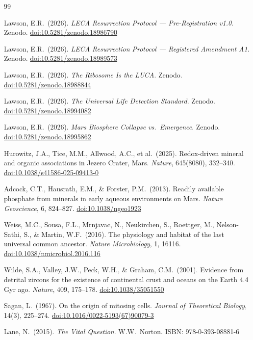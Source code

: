 \documentclass[11pt, a4paper]{article}
\begin{document}
\begin{thebibliography}{99}

Lawson, E.R.\ (2026).
\textit{LECA Resurrection Protocol ---
Pre-Registration v1.0}.
Zenodo.
\href{https://doi.org/10.5281/zenodo.18986790}
{doi:10.5281/zenodo.18986790}

Lawson, E.R.\ (2026).
\textit{LECA Resurrection Protocol ---
Registered Amendment A1}.
Zenodo.
\href{https://doi.org/10.5281/zenodo.18989573}
{doi:10.5281/zenodo.18989573}

Lawson, E.R.\ (2026).
\textit{The Ribosome Is the LUCA}.
Zenodo.
\href{https://doi.org/10.5281/zenodo.18988844}
{doi:10.5281/zenodo.18988844}

Lawson, E.R.\ (2026).
\textit{The Universal Life Detection Standard}.
Zenodo.
\href{https://doi.org/10.5281/zenodo.18994082}
{doi:10.5281/zenodo.18994082}

Lawson, E.R.\ (2026).
\textit{Mars Biosphere Collapse vs.\ Emergence}.
Zenodo.
\href{https://doi.org/10.5281/zenodo.18995862}
{doi:10.5281/zenodo.18995862}

Hurowitz, J.A., Tice, M.M., Allwood, A.C.,
et al.\ (2025).
Redox-driven mineral and organic associations
in Jezero Crater, Mars.
\textit{Nature}, 645(8080), 332--340.
\href{https://doi.org/10.1038/s41586-025-09413-0}
{doi:10.1038/s41586-025-09413-0}

Adcock, C.T., Hausrath, E.M.,
\& Forster, P.M.\ (2013).
Readily available phosphate from minerals
in early aqueous environments on Mars.
\textit{Nature Geoscience}, 6, 824--827.
\href{https://doi.org/10.1038/ngeo1923}
{doi:10.1038/ngeo1923}

Weiss, M.C., Sousa, F.L., Mrnjavac, N.,
Neukirchen, S., Roettger, M.,
Nelson-Sathi, S., \& Martin, W.F.\ (2016).
The physiology and habitat of the last
universal common ancestor.
\textit{Nature Microbiology}, 1, 16116.
\href{https://doi.org/10.1038/nmicrobiol.2016.116}
{doi:10.1038/nmicrobiol.2016.116}

Wilde, S.A., Valley, J.W., Peck, W.H.,
\& Graham, C.M.\ (2001).
Evidence from detrital zircons for the
existence of continental crust and oceans
on the Earth 4.4\,Gyr ago.
\textit{Nature}, 409, 175--178.
\href{https://doi.org/10.1038/35051550}
{doi:10.1038/35051550}

Sagan, L.\ (1967).
On the origin of mitosing cells.
\textit{Journal of Theoretical Biology},
14(3), 225--274.
\href{https://doi.org/10.1016/0022-5193(67)90079-3}
{doi:10.1016/0022-5193(67)90079-3}

Lane, N.\ (2015).
\textit{The Vital Question}.
W.W.\ Norton.
ISBN: 978-0-393-08881-6

\end{thebibliography}
\end{document}
